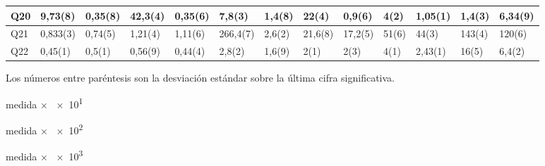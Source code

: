 \documentclass[12pt, letter paper]{report}
\begin{document}
\begin{landscape}
\begin{table}
\begin{threeparttable}
\begin{tabular}{| l | l | l | l | l | l | l | l | l | l | l | l | l |}
                Q20 & 9,73(8)  & 0,35(8) & 42,3(4) & 0,35(6) & 7,8(3)       & 1,4(8)  & 22(4)          & 0,9(6)         & 4(2)\tnote{2}   & 1,05(1)         & 1,4(3)\tnote{3} & 6,34(9)         \\ \hline
                Q21 & 0,833(3) & 0,74(5) & 1,21(4) & 1,11(6) & 266,4(7)     & 2,6(2)  & 21,6(8)        & 17,2(5)        & 51(6)           & 44(3)           & 143(4)          & 120(6)          \\ \hline
                Q22 & 0,45(1)  & 0,5(1)  & 0,56(9) & 0,44(4) & 2,8(2)       & 1,6(9)  & 2(1)           & 2(3)           & 4(1)            & 2,43(1)         & 16(5)           & 6,4(2)          \\ \hline
              \end{tabular}
              \begin{tablenotes}
                \item[1] Los números entre paréntesis son la desviación estándar
                sobre la última cifra significativa.
                \item[2] medida $\times$ \num{e1}
                \item[3] medida $\times$ \num{e2}
                \item[4] medida $\times$ \num{e3}
              \end{tablenotes}
              \label{tab:tiempos}
            \end{threeparttable}
          \end{table}
        \end{landscape}
\end{document}
